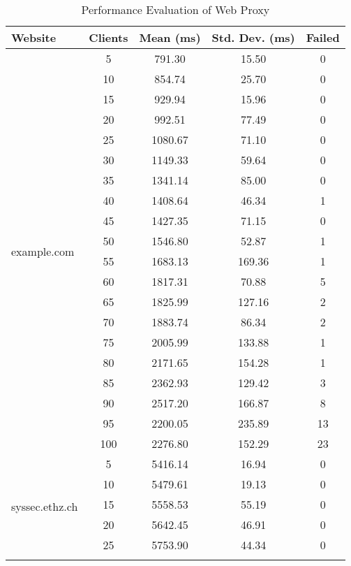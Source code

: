 \begin{table}[h!]  \label{tab:experiment2-table}
\centering
\caption{Performance Evaluation of Web Proxy}
\begin{tabular}{lcccc}
\hline
\textbf{Website}        & \textbf{Clients} & \textbf{Mean (ms)} & \textbf{Std. Dev. (ms)} & \textbf{Failed} \\ \hline
\multirow{20}{*}{example.com} 
    & 5  & 791.30  & 15.50  & 0 \\ \cline{2-5} 
    & 10 & 854.74  & 25.70  & 0 \\ \cline{2-5} 
    & 15 & 929.94  & 15.96  & 0 \\ \cline{2-5} 
    & 20 & 992.51  & 77.49  & 0 \\ \cline{2-5} 
    & 25 & 1080.67 & 71.10  & 0 \\ \cline{2-5} 
    & 30 & 1149.33 & 59.64  & 0 \\ \cline{2-5} 
    & 35 & 1341.14 & 85.00  & 0 \\ \cline{2-5} 
    & 40 & 1408.64 & 46.34  & 1 \\ \cline{2-5} 
    & 45 & 1427.35 & 71.15  & 0 \\ \cline{2-5} 
    & 50 & 1546.80 & 52.87  & 1 \\ \cline{2-5} 
    & 55 & 1683.13 & 169.36 & 1 \\ \cline{2-5} 
    & 60 & 1817.31 & 70.88  & 5 \\ \cline{2-5} 
    & 65 & 1825.99 & 127.16 & 2 \\ \cline{2-5} 
    & 70 & 1883.74 & 86.34  & 2 \\ \cline{2-5} 
    & 75 & 2005.99 & 133.88 & 1 \\ \cline{2-5} 
    & 80 & 2171.65 & 154.28 & 1 \\ \cline{2-5} 
    & 85 & 2362.93 & 129.42 & 3 \\ \cline{2-5} 
    & 90 & 2517.20 & 166.87 & 8 \\ \cline{2-5} 
    & 95 & 2200.05 & 235.89 & 13 \\ \cline{2-5} 
    & 100 & 2276.80 & 152.29 & 23 \\ \hline
\multirow{20}{*}{syssec.ethz.ch} 
    & 5  & 5416.14  & 16.94  & 0 \\ \cline{2-5} 
    & 10 & 5479.61  & 19.13  & 0 \\ \cline{2-5} 
    & 15 & 5558.53  & 55.19  & 0 \\ \cline{2-5} 
    & 20 & 5642.45  & 46.91  & 0 \\ \cline{2-5} 
    & 25 & 5753.90  & 44.34  & 0 \\ \cline{2-5} 

\end{tabular}
\end{table}
